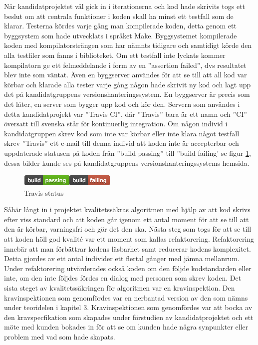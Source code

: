 När kandidatprojektet väl gick in i iterationerna och kod hade skrivits togs ett beslut om att centrala funktioner i koden skall ha minst ett testfall som de klarar. Testerna kördes varje gång man kompilerade koden, detta genom ett byggsystem som hade utvecklats i språket Make. Byggsystemet kompilerade koden med kompilatorsträngen som har nämnts tidigare och samtidigt körde den alla testfiler som fanns i biblioteket. Om ett testfall inte lyckats kommer kompilatorn ge ett felmeddelande i form av en ''assertion failed'', dvs resultatet blev inte som väntat. Även en byggserver användes för att se till att all kod var körbar och klarade alla tester varje gång någon hade skrivit ny kod och lagt upp det på kandidatgruppens versionshanteringssystem. En  byggserver är precis som det låter, en server som bygger upp kod och kör den. Servern som användes i detta kandidatprojekt var ''Travis CI'', där ''Travis'' bara är ett namn och ''CI'' översatt till svenska står för kontinuerlig integration. Om någon individ i kandidatgruppen skrev kod som inte var körbar eller inte klara något testfall skrev ''Travis'' ett e-mail till denna individ att koden inte är accepterbar och uppdaterade statusen på koden från ''build passing'' till ''build failing' se figur \ref{fig:travisstatus}, dessa bilder kunde ses på kandidatgruppens versionshanteringssystems hemsida.
\begin{figure}[h]
\centerline{\includegraphics[scale=0.8]{ruben-tex/graphic/travisstatus}}
\caption{Travis status}
\label{fig:travisstatus}
\end{figure}
\newline
Såhär långt in i projektet kvalitetssäkras algoritmen med hjälp av att kod skrivs efter viss standard och att koden går igenom ett antal moment för att se till att den är körbar, varningsfri och gör det den ska. Nästa steg som togs för att se till att koden höll god kvalité var ett moment som kallas refaktorering. Refaktorering innebär att man förbättrar kodens läsbarhet samt reducerar kodens komplexitet. Detta gjordes av ett antal individer ett flertal gånger med jämna mellanrum. Under refaktorering utvärderades också koden om den följde kodstandarden eller inte, om den inte följdes fördes en dialog med personen som skrev koden.
\newline
\newline
Det sista steget av kvalitetssäkringen för algoritmen var en kravinspektion. Den kravinspektionen som genomfördes var en nerbantad version av den som nämns under teoridelen i kapitel 3. Kravinspektionen som genomfördes var att bocka av den kravspecfikation som skapades under förstudien av kandidatprojektet och ett möte med kunden bokades in för att se om kunden hade några synpunkter eller problem med vad som hade skapats.

